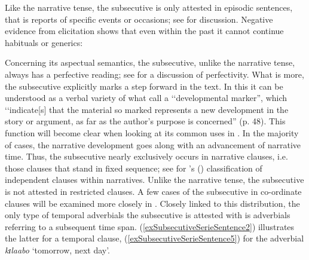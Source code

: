 Like the narrative tense, the subsecutive is only attested in episodic sentences, that is reports of specific events or occasions; see  for discussion. Negative evidence from elicitation shows that even within the past it cannot continue habituals or generics:

\begin{exe}
\ex
\begin{xlist}
\end{xlist}
\end{exe}

Concerning its aspectual semantics, the subsecutive, unlike the narrative tense, always has a perfective reading; see  for a discussion of perfectivity. What is more, the subsecutive explicitly marks a step forward in the text. In this it can be understood as a verbal variety of what \citet{DooleyRALevinsohnSH2000} call a \lq\lq developmental marker'', which \lq\lq indicate[s] that the material so marked represents a new development in the story or argument, as far as the author's purpose is concerned'' (p. 48). This function will become clear when looking at its common uses in . In the majority of cases, the narrative development goes along with an advancement of narrative time. Thus, the subsecutive nearly exclusively occurs in narrative clauses, i.e. those clauses that stand in fixed sequence; see  for \citeauthor{LabovWWaletzkyJ1967}'s (\citeyear{LabovWWaletzkyJ1967}) classification of independent clauses within narratives. Unlike the narrative tense, the subsecutive is not attested in restricted clauses. A few cases of the subsecutive in co-ordinate clauses will be examined more closely in . Closely linked to this distribution, the only type of temporal adverbials the subsecutive is attested with is adverbials referring to a subsequent time span. (\ref{exSubsecutiveSerieSentence2}) illustrates the latter for a temporal clause, (\ref{exSubsecutiveSerieSentence5}) for the adverbial \textit{kɪlaabo} \lq tomorrow, next day'. 

